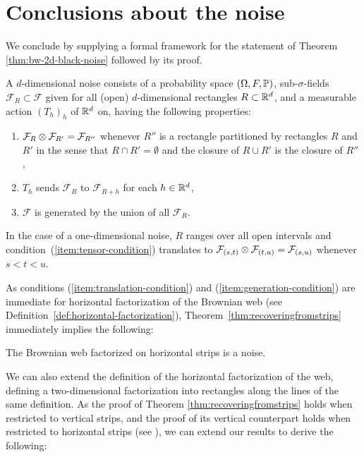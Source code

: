{
\section{Conclusions about the noise}

We conclude by supplying a formal framework for the statement of
Theorem \ref{thm:bw-2d-black-noise} followed by its proof.

\newcommand{\F}{\mathcal{F}}
A $d$-dimensional noise consists of a probability space $(\Omega,F, \P)$, sub-$\sigma$-fields $\F_R \subset \F$ given for
all (open) $d$-dimensional rectangles $R \subset \R^d$, and a measurable action $(T_h)_h$ of $\R^d$ on, having the following
properties:
\begin{enumerate}
\item \label{item:tensor-condition} $\F_R \tensor \F_{R'} = \F_{R''}$ whenever $R''$ is a
rectangle partitioned by rectangles $R$ and $R'$ in the sense that
$R\cap R'=\emptyset$ and the closure of $R \cup R'$
is the closure of $R''$,
\item \label{item:translation-condition} $T_h$ sends $\F_R$ to $\F_{R+h}$ for each $h \in \R^d$,
\item \label{item:generation-condition} $\F$ is generated by the union of all $\F_R$.
\end{enumerate}

In the case of a one-dimensional noise, $R$ ranges over all open intervals
and condition~(\ref{item:tensor-condition}) translates to
$\F_{(s,t)} \tensor \F_{(t,u)} = \F_{(s,u)}$ whenever $s < t < u$.

As conditions (\ref{item:translation-condition}) and
(\ref{item:generation-condition}) are immediate for
horizontal factorization of the Brownian web (see
Definition~\ref{def:horizontal-factorization}),
Theorem~\ref{thm:recoveringfromstrips} immediately
implies the following:

\begin{theorem}
The Brownian web factorized on horizontal strips is a noise.
\end{theorem}

We can also extend the definition of the horizontal
factorization of the web, defining a two-dimensional
factorization into rectangles along the lines of the
same definition. As the proof of Theorem \ref{thm:recoveringfromstrips}
holds when restricted to vertical strips, and the proof of its vertical
counterpart holds when restricted to horizontal strips (see ), we can extend our results to derive the following:

}

